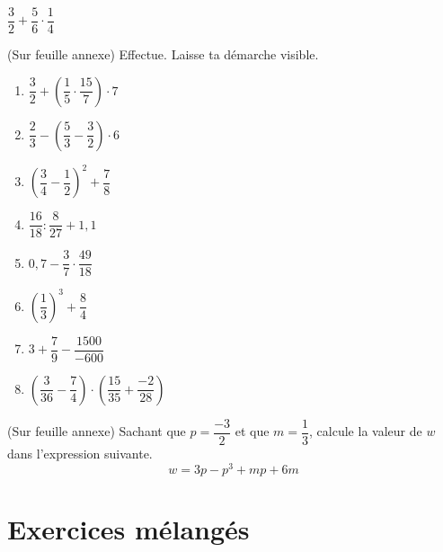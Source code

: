 \documentclass[../math2.tex]{subfiles}
\begin{document}
\exemple $\dfrac{3}{2} + \dfrac{5}{6} \cdot \dfrac{1}{4}$
\vspace*{4cm}

\begin{exercise}
  (Sur feuille annexe) Effectue. Laisse ta démarche visible.
  \begin{enumerate}[cols=2]
    \item $\dfrac{3}{2}+\left(\dfrac{1}{5}\cdot \dfrac{15}{7}\right)\cdot 7$
    \item $\dfrac{2}{3}-\left(\dfrac{5}{3}-\dfrac{3}{2}\right)\cdot 6$
    \item $\left(\dfrac{3}{4}-\dfrac{1}{2}\right)^2+\dfrac{7}{8}$
    \item $\dfrac{16}{18} : \dfrac{8}{27}+1,1$
    \item $0,7-\dfrac{3}{7} \cdot \dfrac{49}{18}$
    \item $\left(\dfrac{1}{3}\right)^3 + \dfrac{8}{4}$
    \item $3+\dfrac{7}{9}-\dfrac{1500}{-600}$
    \item $\left(\dfrac{3}{36}-\dfrac{7}{4}\right) \cdot \left(\dfrac{15}{35}+\dfrac{-2}{28}\right)$
  \end{enumerate}
\end{exercise}


\begin{exercise}
  (Sur feuille annexe) Sachant que $p=\dfrac{-3}{2}$ et que $m=\dfrac{1}{3}$, calcule la valeur de $w$ dans l'expression suivante.
  \vspace{0.5cm} %
  \[w=3p-p^3+mp+6m\]
\end{exercise}

\newpage
\section{Exercices mélangés}
\end{document}
